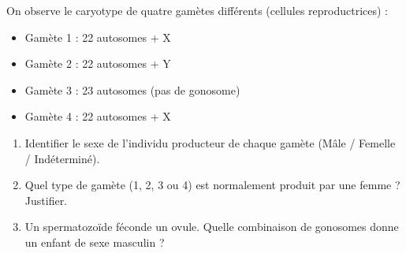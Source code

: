 \documentclass[11pt]{article}
\begin{document}
\begin{exercice}
On observe le caryotype de quatre gamètes différents (cellules reproductrices) :
\begin{itemize}
    \item Gamète 1 : 22 autosomes + X
    \item Gamète 2 : 22 autosomes + Y
    \item Gamète 3 : 23 autosomes (pas de gonosome)
    \item Gamète 4 : 22 autosomes + X
\end{itemize}
\begin{enumerate}
    \item Identifier le sexe de l'individu producteur de chaque gamète (Mâle / Femelle / Indéterminé).
    \item Quel type de gamète (1, 2, 3 ou 4) est normalement produit par une femme ? Justifier.
    \item Un spermatozoïde féconde un ovule. Quelle combinaison de gonosomes donne un enfant de sexe masculin ?
\end{enumerate}
\end{exercice}
\end{document}
